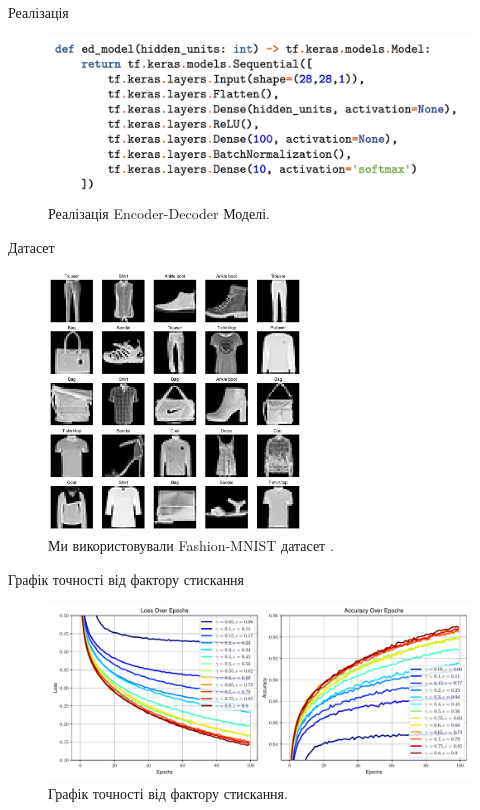 \documentclass{zkdl-presentation-template}
\begin{document}
    \begin{frame}{Реалізація}
        \begin{figure}
            \centering
            \includegraphics[width=\textwidth]{images/code.png}
            \caption{Реалізація Encoder-Decoder Моделі.}
            \label{figure:encoder-decoder}
        \end{figure}
    \end{frame}

    \begin{frame}{Датасет}
        \begin{figure}
            \centering
            \includegraphics[width=0.6\textwidth]{images/fashion_mnist_grid.pdf}
            \caption{Ми використовували Fashion-MNIST датасет \cite{fashion-mnist}.}
            \label{figure:fashion-mnist}
        \end{figure}
    \end{frame}

    \begin{frame}{Графік точності від фактору стискання}
        \begin{figure}
            \centering
            \includegraphics[width=\textwidth]{images/accuracy_loss_over_epochs_3.pdf}
            \caption{Графік точності від фактору стискання.}
            \label{figure:encoder-decoder-graph}
        \end{figure}
    \end{frame}
\end{document}

